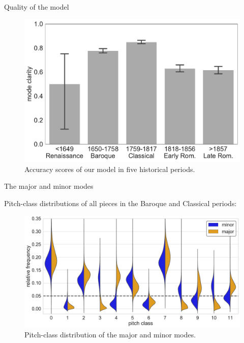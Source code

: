 \begin{frame}{Quality of the model}
    \begin{figure}
        \centering
        \includegraphics[width=\linewidth,height=.7\textheight,keepaspectratio]{img/Figure5.pdf}
        \caption{Accuracy scores of our model in five historical periods.}
    \end{figure}
\end{frame}

\begin{frame}{The major and minor modes}

    Pitch-class distributions of all pieces in the Baroque and Classical periods:

    \begin{figure}
        \centering
        \includegraphics[width=\linewidth,height=.7\textheight,keepaspectratio]{img/Figure8.pdf}
        \caption{Pitch-class distribution of the major and minor modes.}
    \end{figure}
\end{frame}


